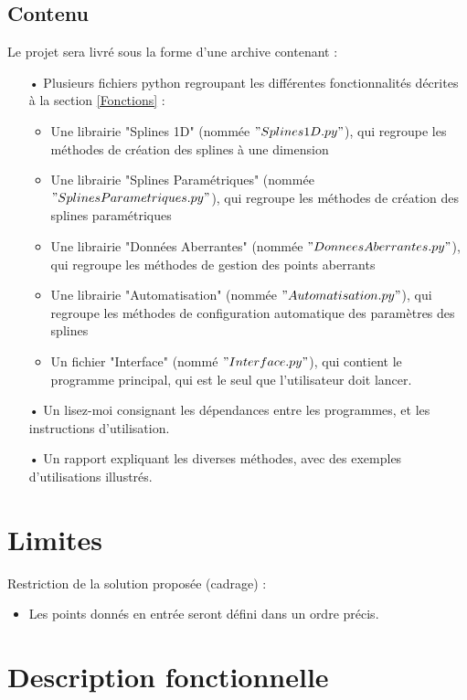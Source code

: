 \documentclass[a4paper,12pt]{article}
\begin{document}
\subsection*{Contenu}
Le projet sera livré sous la forme d'une archive contenant :
\begin{itemize}
\item[•] Plusieurs fichiers python regroupant les différentes fonctionnalités décrites à la section \ref{Fonctions}  : 
\begin{itemize}
\item Une librairie "Splines 1D" (nommée $"Splines1D.py"$), qui regroupe les méthodes de création des splines à une dimension
\item Une librairie "Splines Paramétriques" (nommée $"SplinesParametriques.py"$), qui regroupe les méthodes de création des splines paramétriques
\item Une librairie "Données Aberrantes" (nommée $"DonneesAberrantes.py"$), qui regroupe les méthodes de gestion des points aberrants
\item Une librairie "Automatisation" (nommée $"Automatisation.py"$), qui regroupe les méthodes de configuration automatique des paramètres des splines
\item Un fichier "Interface" (nommé $"Interface.py"$), qui contient le programme principal, qui est le seul que l'utilisateur doit lancer.
\end{itemize}
\item[•] Un lisez-moi consignant les dépendances entre les programmes, et les instructions d'utilisation.
\item[•] Un rapport expliquant les diverses méthodes, avec des exemples d’utilisations illustrés.
\end{itemize}

\newpage
\section{Limites}

Restriction de la solution proposée (cadrage) :
\begin{itemize}
\item Les points donnés en entrée seront défini dans un ordre précis.
\end{itemize}

\newpage
\section{Description fonctionnelle}
\end{document}

